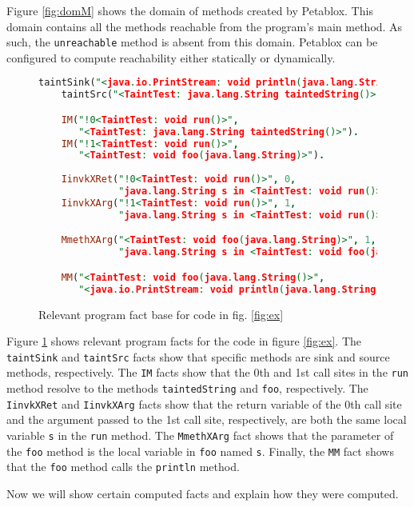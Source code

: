 Figure \ref{fig:domM} shows the domain of methods created by
Petablox. This domain contains all the methods reachable from the
program's main method. As such, the \texttt{unreachable} method is
absent from this domain. Petablox can be configured to compute
reachability either statically or dynamically.

\begin{figure}[H]
  \begin{lstlisting}[language=Prolog]
    taintSink("<java.io.PrintStream: void println(java.lang.String)>").
    taintSrc("<TaintTest: java.lang.String taintedString()>").

    IM("!0<TaintTest: void run()>",
       "<TaintTest: java.lang.String taintedString()>").
    IM("!1<TaintTest: void run()>",
       "<TaintTest: void foo(java.lang.String)>").
    
    IinvkXRet("!0<TaintTest: void run()>", 0,
              "java.lang.String s in <TaintTest: void run()>").
    IinvkXArg("!1<TaintTest: void run()>", 1,
              "java.lang.String s in <TaintTest: void run()>").

    MmethXArg("<TaintTest: void foo(java.lang.String)>", 1,
              "java.lang.String s in <TaintTest: void foo(java.lang.String)>").

    MM("<TaintTest: void foo(java.lang.String()>",
       "<java.io.PrintStream: void println(java.lang.String)>").
  \end{lstlisting}
  \caption{Relevant program fact base for code in fig. \ref{fig:ex}}\label{fig:facts}
\end{figure}

Figure \ref{fig:facts} shows relevant program facts for the code in
figure \ref{fig:ex}. The \texttt{taintSink} and \texttt{taintSrc}
facts show that specific methods are sink and source methods,
respectively. The \texttt{IM} facts show that the 0th and 1st call
sites in the \texttt{run} method resolve to the methods
\texttt{taintedString} and \texttt{foo}, respectively. The
\texttt{IinvkXRet} and \texttt{IinvkXArg} facts show that the return
variable of the 0th call site and the argument passed to the 1st call
site, respectively, are both the same local variable \texttt{s} in the
\texttt{run} method. The \texttt{MmethXArg} fact shows that the
parameter of the \texttt{foo} method is the local variable in
\texttt{foo} named \texttt{s}. Finally, the \texttt{MM} fact shows
that the \texttt{foo} method calls the \texttt{println} method.

Now we will show certain computed facts and explain how they were
computed.

